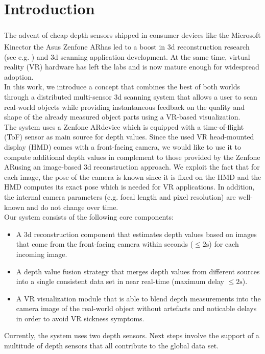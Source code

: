 \documentclass[conference]{IEEEtran}
\begin{document}
\section{Introduction}
The advent of cheap depth sensors shipped in consumer devices like the Microsoft\textsuperscript{\textcopyright} Kinect\texttrademark \space or the Asus\textsuperscript{\textcopyright} Zenfone AR\texttrademark \space has led to a boost in 3d reconstruction research (see e.g. \cite{Graber2011,Steinbruecker13,fuhrmann2011}) and 3d scanning application development. 
At the same time, virtual reality (VR) hardware has left the labs and is now mature enough for widespread adoption.    
\\
In this work, we introduce a concept that combines the best of both worlds through a distributed multi-sensor 3d scanning system that allows a user to scan real-world objects while providing instantaneous feedback on the quality and shape of the already measured object parts using a VR-based visualization.
\\
The system uses a Zenfone AR\texttrademark \space device which is equipped with a time-of-flight (ToF) sensor as main source for depth values. 
Since the used VR head-mounted display (HMD) comes with a front-facing camera, we would like to use it to compute additional depth values in complement to those provided by the Zenfone AR\texttrademark \space using an image-based 3d reconstruction approach\cite{Seitz2006}. 
We exploit the fact that for each image, the pose of the camera is known since it is fixed on the HMD and the HMD computes its exact pose which is needed for VR applications.
In addition, the internal camera parameters (e.g. focal length and pixel resolution) are well-known and do not change over time.   
\\
Our system consists of the following core components:
\begin{itemize}
\item A 3d reconstruction component that estimates depth values based on images that come from the front-facing camera within seconds ($\leq 2\text{s}$) for each incoming image. 
\item A depth value fusion strategy that merges depth values from different sources into a single consistent data set in near real-time (maximum delay $\leq 2\text{s}$).
\item A VR visualization module that is able to blend depth measurements into the camera image of the real-world object without artefacts and noticable delays in order to avoid VR sickness symptoms. 
\end{itemize}
Currently, the system uses two depth sensors. 
Next steps involve the support of a multitude of depth sensors that all contribute to the global data set.   
\end{document}
